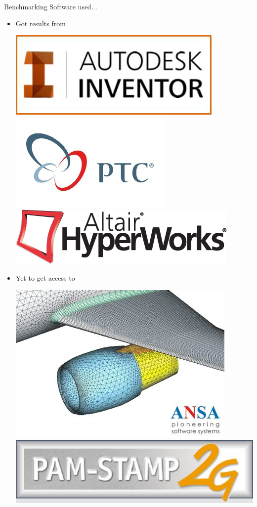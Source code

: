 
\begin{frame}{Benchmarking Software used...}
\begin{itemize}[noitemsep,label=\textbullet,topsep=2pt,parsep=2pt,partopsep=2pt]

\item Got results from 

\includegraphics[width=0.3\linewidth]{../Common/images/Logo_AutodeskInventor}
\vspace{5mm}
\includegraphics[width=0.3\linewidth]{../Common/images/Logo_PTC}
\includegraphics[width=0.3\linewidth]{../Common/images/Logo_Altair}

\item Yet to get access to

\vspace{5mm}
\includegraphics[width=0.3\linewidth]{../Common/images/Logo_Ansa.jpeg}
\vspace{35mm}
\includegraphics[width=0.3\linewidth]{../Common/images/Logo_PamStamp}


\end{itemize}
\end{frame}
